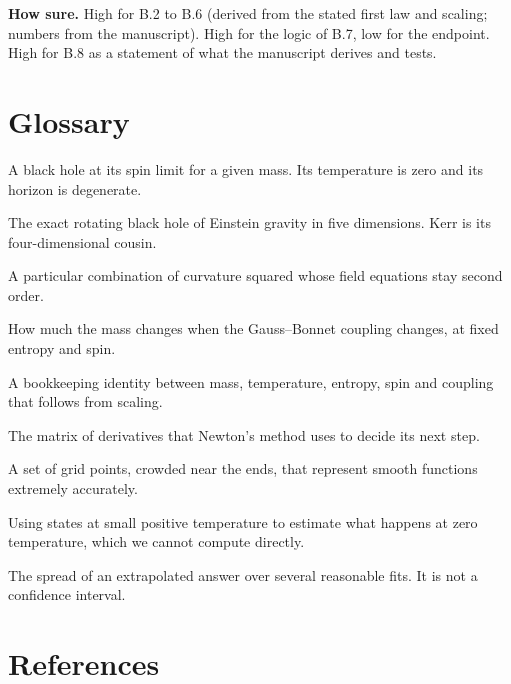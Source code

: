 \documentclass[12pt,a4paper]{article}
\begin{document}
\textbf{How sure.} High for B.2 to B.6 (derived from the stated first law and scaling;
numbers from the manuscript). High for the logic of B.7, low for the endpoint. High
for B.8 as a statement of what the manuscript derives and tests.

\section*{Glossary}

\begin{description}[leftmargin=0pt,style=nextline,itemsep=2pt]
\item[Extremal] A black hole at its spin limit for a given mass. Its temperature is
zero and its horizon is degenerate.
\item[Myers--Perry] The exact rotating black hole of Einstein gravity in five
dimensions. Kerr is its four-dimensional cousin.
\item[Gauss--Bonnet term] A particular combination of curvature squared whose field
equations stay second order.
\item[$\Psi$] How much the mass changes when the Gauss--Bonnet coupling changes, at
fixed entropy and spin.
\item[Smarr relation] A bookkeeping identity between mass, temperature, entropy, spin
and coupling that follows from scaling.
\item[Jacobian] The matrix of derivatives that Newton's method uses to decide its
next step.
\item[Chebyshev--Lobatto points] A set of grid points, crowded near the ends, that
represent smooth functions extremely accurately.
\item[Extrapolation] Using states at small positive temperature to estimate what
happens at zero temperature, which we cannot compute directly.
\item[Sensitivity bar] The spread of an extrapolated answer over several reasonable
fits. It is not a confidence interval.
\end{description}

\section*{References}
\end{document}
